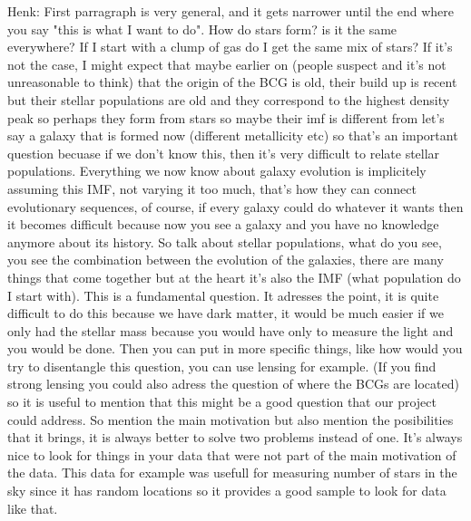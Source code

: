 Henk: First parragraph is very general, and it gets narrower until the end where you say "this is what I want to do". How do stars form? is it the same everywhere? If I start with a clump of gas do I get the same mix of stars? If it's not the case, I might expect that maybe earlier on (people suspect and it's not unreasonable to think) that the origin of the BCG is old, their build up is recent but their stellar populations are old and they correspond to the highest density peak so perhaps they form from stars so maybe their imf is different from let's say a galaxy that is formed now (different metallicity etc) so that's an important question becuase if we don't know this, then it's very difficult to relate stellar populations. Everything we now know about galaxy evolution is implicitely assuming this IMF, not varying it too much, that's how they can connect evolutionary sequences, of course, if every galaxy could do whatever it wants then it becomes difficult because now you see a galaxy and you have no knowledge anymore about its history. So talk about stellar populations, what do you see, you see the combination between the evolution of the galaxies, there are many things that come together but at the heart it's also the IMF (what population do I start with). This is a fundamental question. It adresses the point, it is quite difficult to do this because we have dark matter, it would be much easier if we only had the stellar mass because you would have only to measure the light and you would be done. Then you can put in more specific things, like how would you try to disentangle this question, you can use lensing for example. (If you find strong lensing you could also adress the question of where the BCGs are located) so it is useful to mention that this might be a good question that our project could address. So mention the main motivation but also mention the posibilities that it brings, it is always better to solve two problems instead of one. It's always nice to look for things in your data that were not part of the main motivation of the data. This data for example was usefull for measuring number of stars in the sky since it has random locations so it provides a good sample to look for data like that.

